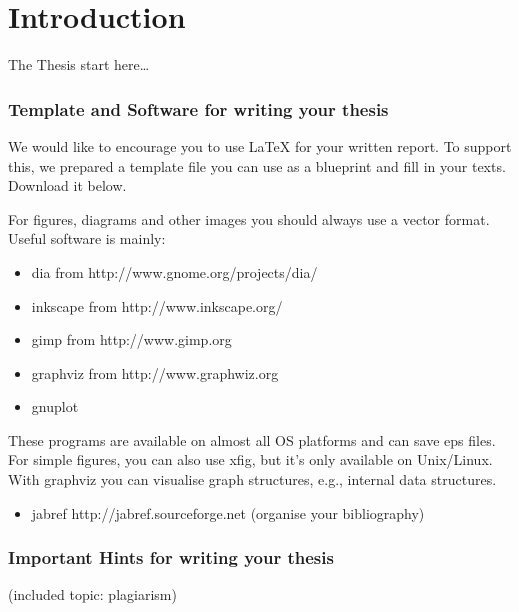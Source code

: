 \chapter{Introduction}
The Thesis start here\dots

\subsection{Template and Software for writing your thesis}

We would like to encourage you to use LaTeX for your written report. To support this, we prepared a template file you can use as a blueprint and fill in your texts. Download it below.

For figures, diagrams and other images you should always use a vector format. Useful software is mainly:
\begin{itemize}
\item[] dia from http://www.gnome.org/projects/dia/
\item[] inkscape from http://www.inkscape.org/
\item[] gimp from http://www.gimp.org
\item[] graphviz from http://www.graphwiz.org
\item[] gnuplot
\end{itemize}
These programs are available on almost all OS platforms and can
save eps files. For simple figures, you can also use xfig, but
it's only available on Unix/Linux. With graphviz you can
visualise graph structures, e.g., internal data structures.

\begin{itemize}
\item[] jabref http://jabref.sourceforge.net (organise your
        bibliography)
\end{itemize}

\subsection{Important Hints for writing your thesis}
(included topic: plagiarism)

